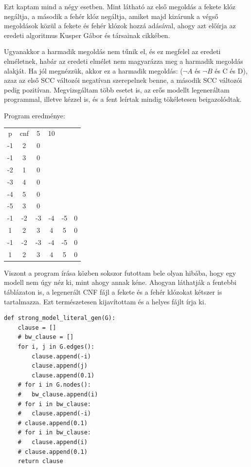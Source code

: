 \documentclass[
]{thesis-ekf}
\theoremstyle{definition}
\theoremstyle{remark}
\begin{document}
	Ezt kaptam mind a négy esetben. Mint látható az első megoldás a fekete klóz negáltja, a második a fehér klóz negáltja, amiket majd kizárunk a végső megoldások közül a fekete és fehér klózok hozzá adásával, ahogy azt előírja az eredeti algoritmus Kusper Gábor és társainak cikkében\cite{am}.
	
	Ugyanakkor a harmadik megoldás nem tűnik el, és ez megfelel az eredeti elméletnek, habár az eredeti elmélet nem magyarázza meg a harmadik megoldás alakját. Ha jól megnézzük, akkor ez a harmadik megoldás: ($ \neg A $ és $ \neg B $ és C és D), azaz az első \textsc{SCC} változói negatívan szerepelnek benne, a második \textsc{SCC} változói pedig pozitívan. Megvizsgáltam több esetet is, az erős modellt legeneráltam programmal, illetve kézzel is, és a fent leírtak mindig tökéletesen beigazolódtak.
	
	Program eredménye:
	
	\begin{tabular}{cccccc}
		p & cnf & 5 & 10 & &   \\
		-1&  2 &  0&   &   &   \\
		-1&  3 &  0&   &   &   \\
		-2&  1 &  0&   &   &   \\
		-3&  4 &  0&   &   &   \\
		-4&  5 &  0&   &   &   \\
		-5&  3 &  0&   &   &   \\
		-1& -2 & -3& -4& -5& 0 \\
		 1&  2 &  3&  4&  5& 0 \\
		-1& -2 & -3& -4& -5& 0 \\
		 1&  2 &  3&  4&  5& 0 \\
	\end{tabular}

	Viszont a program írása közben sokszor futottam bele olyan hibába, hogy egy modell nem úgy néz ki, mint ahogy annak kéne. Ahogyan láthatják a fentebbi táblázaton is, a legenerált \textsc{CNF} fájl a fekete és a fehér klózokat kétszer is tartalmazza. Ezt természetesen kijavítottam és a helyes fájlt írja ki. 
	
	\begin{lstlisting}
def strong_model_literal_gen(G):
	clause = []
	# bw_clause = []
	for i, j in G.edges():
		clause.append(-i)
		clause.append(j)
		clause.append(0.1)
	# for i in G.nodes():
	# 	bw_clause.append(i)
	# for i in bw_clause:
	# 	clause.append(-i)
	# clause.append(0.1)
	# for i in bw_clause:
	# 	clause.append(i)
	# clause.append(0.1)
	return clause
	\end{lstlisting}
	
\end{document}

